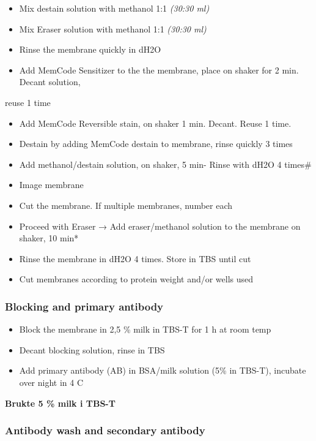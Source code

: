 \documentclass[
  letterpaper,
  DIV=11,
  numbers=noendperiod]{scrreprt}
\providecommand{\tightlist}{%
  \setlength{\itemsep}{0pt}\setlength{\parskip}{0pt}}\usepackage{longtable,booktabs,array}
\begin{document}
\begin{itemize}
\tightlist
\item
  Mix destain solution with methanol 1:1 \emph{(30:30 ml)}
\item
  Mix Eraser solution with methanol 1:1 \emph{(30:30 ml)}
\item
  Rinse the membrane quickly in dH2O
\item
  Add MemCode Sensitizer to the the membrane, place on shaker for 2 min.
  Decant solution,
\end{itemize}

reuse 1 time

\begin{itemize}
\tightlist
\item
  Add MemCode Reversible stain, on shaker 1 min. Decant. Reuse 1 time.
\item
  Destain by adding MemCode destain to membrane, rinse quickly 3 times
\item
  Add methanol/destain solution, on shaker, 5 min- Rinse with dH2O 4
  times\#
\item
  Image membrane
\item
  Cut the membrane. If multiple membranes, number each
\item
  Proceed with Eraser → Add eraser/methanol solution to the membrane on
  shaker, 10 min*
\item
  Rinse the membrane in dH2O 4 times. Store in TBS until cut
\item
  Cut membranes according to protein weight and/or wells used
\end{itemize}

\subsubsection{Blocking and primary
antibody}\label{blocking-and-primary-antibody}

\begin{itemize}
\tightlist
\item
  Block the membrane in 2,5 \% milk in TBS-T for 1 h at room temp
\item
  Decant blocking solution, rinse in TBS
\item
  Add primary antibody (AB) in BSA/milk solution (5\% in TBS-T),
  incubate over night in 4 C
\end{itemize}

\textbf{Brukte 5 \% milk i TBS-T}

\subsubsection{Antibody wash and secondary
antibody}\label{antibody-wash-and-secondary-antibody}
\end{document}
